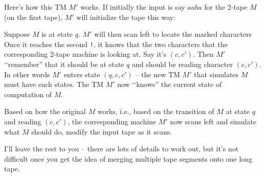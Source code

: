 Here's how this TM $M'$ works.
If initially the input is say $aaba$ for the 2-tape $M$ (on the first tape),
$M'$ will initialize the tape this way:


Suppose $M$ is at state $q$.
$M'$ will then scan left to locate the marked characters
Once it reaches the second \texttt{!}, it knows that the
two characters that the corresponding 2-tape machine is looking
at. Say it's $(c,c')$.
Then $M'$ \lq\lq remember'' that it should be at
state $q$ and should be reading character $(c,c')$.
In other words $M'$ enters state $(q,c,c')$ -- the new TM $M'$ that
simulates $M$ must have such states.
The TM $M'$ now \lq\lq knows'' the current state of computation of $M$.

Based on how the original $M$ works, i.e., based on the transition
of $M$ at state $q$ and reading $(c,c')$, the corresponding
machine $M'$ now scans left and simulate what $M$ should do,
modify the input tape as it scans.

I'll leave the rest to you -- there are lots of details to work out,
but it's not difficult once you get the idea of merging multiple
tape segments onto one long tape.
